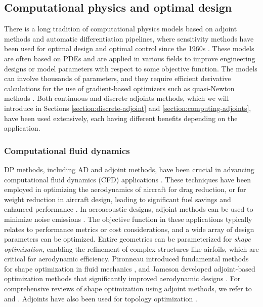
\subsection{Computational physics and optimal design}

There is a long tradition of computational physics models based on adjoint methods and automatic differentiation pipelines, where sensitivity methods have been used for optimal design and optimal control since the 1960s \cite{lions1971optimal}. 
These models are often based on PDEs and are applied in various fields to improve engineering designs or model parameters with respect to some objective function. 
The models can involve thousands of parameters, and they require efficient derivative calculations for the use of gradient-based optimizers such as quasi-Newton methods \cite{nocedal1999numerical}. 
Both continuous and discrete adjoints methods, which we will introduce in Sections \ref{section:discrete-adjoint} and \ref{section:computing-adjoints}, have been used extensively, each having different benefits depending on the application.

\subsubsection{Computational fluid dynamics}

DP methods, including AD and adjoint methods, have been crucial in advancing computational fluid dynamics (CFD) applications \cite{KENWAY2019100542}. 
These techniques have been employed in optimizing the aerodynamics of aircraft for drag reduction, or for weight reduction in aircraft design, leading to significant fuel savings and enhanced performance \cite{jameson2003aerodynamic}. 
In aeroacoustic designs, adjoint methods can be used to minimize noise emissions \cite{FREUND201054}. 
The objective function in these applications typically relates to performance metrics or cost considerations, and a wide array of design parameters can be optimized.
Entire geometries can be parameterized for \emph{shape optimization}, enabling the refinement of complex structures like airfoils, which are critical for aerodynamic efficiency. 
Pironneau introduced fundamental methods for shape optimization in fluid mechanics \cite{Pironneau_1974}, and Jameson developed adjoint-based optimization methods that significantly improved aerodynamic designs \cite{Jameson_1988}. 
For comprehensive reviews of shape optimization using adjoint methods, we refer to \cite{Giles_Pierce_2000} and \cite{mohammadi2009applied}. 
Adjoints have also been used for topology optimization \cite{allaire2014shape}.

